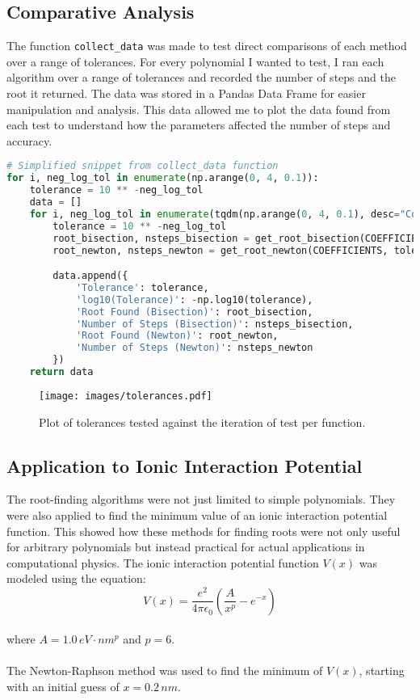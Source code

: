 \documentclass{llncs}
\numberwithin{figure}{section}
\begin{document}
\subsection{Comparative Analysis}
The function \texttt{collect\_data} was made to test direct comparisons of each method over a range of tolerances. For every polynomial I wanted to test, I ran each algorithm over a range of tolerances and recorded the number of steps and the root it returned. The data was stored in a Pandas Data Frame for easier manipulation and analysis. This data allowed me to plot the data found from each test to understand how the parameters affected the number of steps and accuracy.
\vspace{1em}
\begin{lstlisting}[language=Python]
# Simplified snippet from collect_data function
for i, neg_log_tol in enumerate(np.arange(0, 4, 0.1)):
    tolerance = 10 ** -neg_log_tol
    data = []
    for i, neg_log_tol in enumerate(tqdm(np.arange(0, 4, 0.1), desc="Collecting Data")):
        tolerance = 10 ** -neg_log_tol
        root_bisection, nsteps_bisection = get_root_bisection(COEFFICIENTS, tolerance, X_START, X_STOP)
        root_newton, nsteps_newton = get_root_newton(COEFFICIENTS, tolerance, X_START, X_STOP)

        data.append({
            'Tolerance': tolerance,
            'log10(Tolerance)': -np.log10(tolerance),
            'Root Found (Bisection)': root_bisection,
            'Number of Steps (Bisection)': nsteps_bisection,
            'Root Found (Newton)': root_newton,
            'Number of Steps (Newton)': nsteps_newton
        })
    return data
\end{lstlisting}
\vspace{-2em}
\begin{figure}
    \centering
    \texttt{[image: images/tolerances.pdf]}
    \caption{Plot of tolerances tested against the iteration of test per function.}
    \label{fig:enter-label}
    
    
\end{figure}

\subsection{Application to Ionic Interaction Potential}
The root-finding algorithms were not just limited to simple polynomials. They were also applied to find the minimum value of an ionic interaction potential function. This showed how these methods for finding roots were not only useful for arbitrary polynomials but instead practical for actual applications in computational physics.
The ionic interaction potential function $V(x)$ was modeled using the equation:
\vspace{1em}
$$
V(x) = \frac{e^2}{4\pi \epsilon_0} \left( \frac{A}{x^p} - e^{-x} \right)
$$
\vspace{1em}
\\where $A = 1.0 \, eV \cdot nm^p$ and $p = 6$.
\\\\The Newton-Raphson method was used to find the minimum of $V(x)$, starting with an initial guess of $x = 0.2 \, nm$.
\vspace{2em}
\end{document}
